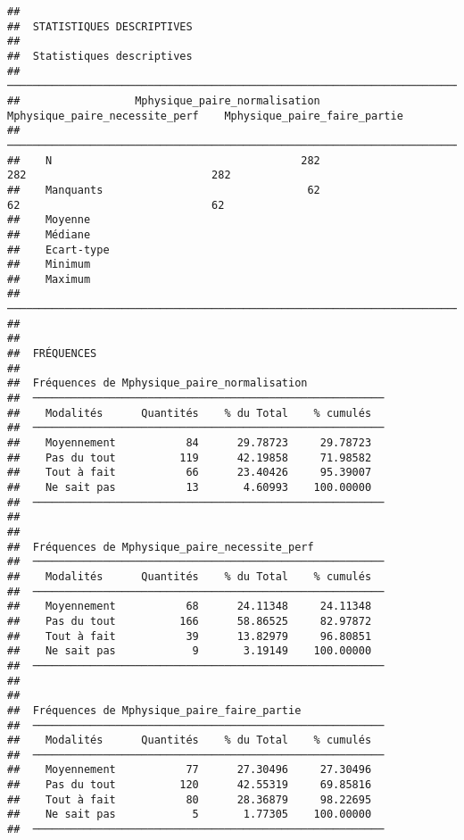 \documentclass[
]{article}
\begin{document}
\begin{verbatim}
## 
##  STATISTIQUES DESCRIPTIVES
## 
##  Statistiques descriptives                                                                                         
##  ───────────────────────────────────────────────────────────────────────────────────────────────────────────────── 
##                  Mphysique_paire_normalisation    Mphysique_paire_necessite_perf    Mphysique_paire_faire_partie   
##  ───────────────────────────────────────────────────────────────────────────────────────────────────────────────── 
##    N                                       282                               282                             282   
##    Manquants                                62                                62                              62   
##    Moyenne                                                                                                         
##    Médiane                                                                                                         
##    Ecart-type                                                                                                      
##    Minimum                                                                                                         
##    Maximum                                                                                                         
##  ───────────────────────────────────────────────────────────────────────────────────────────────────────────────── 
## 
## 
##  FRÉQUENCES
## 
##  Fréquences de Mphysique_paire_normalisation             
##  ─────────────────────────────────────────────────────── 
##    Modalités      Quantités    % du Total    % cumulés   
##  ─────────────────────────────────────────────────────── 
##    Moyennement           84      29.78723     29.78723   
##    Pas du tout          119      42.19858     71.98582   
##    Tout à fait           66      23.40426     95.39007   
##    Ne sait pas           13       4.60993    100.00000   
##  ─────────────────────────────────────────────────────── 
## 
## 
##  Fréquences de Mphysique_paire_necessite_perf            
##  ─────────────────────────────────────────────────────── 
##    Modalités      Quantités    % du Total    % cumulés   
##  ─────────────────────────────────────────────────────── 
##    Moyennement           68      24.11348     24.11348   
##    Pas du tout          166      58.86525     82.97872   
##    Tout à fait           39      13.82979     96.80851   
##    Ne sait pas            9       3.19149    100.00000   
##  ─────────────────────────────────────────────────────── 
## 
## 
##  Fréquences de Mphysique_paire_faire_partie              
##  ─────────────────────────────────────────────────────── 
##    Modalités      Quantités    % du Total    % cumulés   
##  ─────────────────────────────────────────────────────── 
##    Moyennement           77      27.30496     27.30496   
##    Pas du tout          120      42.55319     69.85816   
##    Tout à fait           80      28.36879     98.22695   
##    Ne sait pas            5       1.77305    100.00000   
##  ───────────────────────────────────────────────────────
\end{verbatim}
\end{document}
